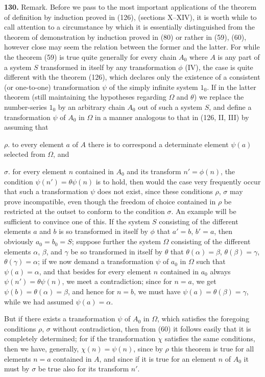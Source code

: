 \documentclass[oneside]{book}
\newcommand\mypara{\medskip\textbf}
\begin{document}
\mypara{130.} Remark. Before we pass to the most important
applications of the theorem of definition by induction
proved in (126), (sections X--XIV), it is worth
while to call attention to a circumstance by which it
is essentially distinguished from the theorem of demonstration
by induction proved in (80) or rather in
(59), (60), however close may seem the relation between
the former and the latter. For while the theorem
(59) is true quite generally for every chain $A_0$ where
$A$ is any part of a system $S$ transformed in itself by
any transformation $\phi$ (IV), the case is quite different
with the theorem (126), which declares only the existence
of a consistent (or one-to-one) transformation $\psi$
of the simply infinite system $1_0$. If in the latter theorem
(still maintaining the hypotheses regarding $\Omega$
and $\theta$) we replace the number-series $1_0$ by an arbitrary
chain $A_0$ out of such a system $S$, and define a transformation
$\psi$ of $A_0$ in $\Omega$ in a manner analogous to that
in (126, II, III) by assuming that

$\rho$. to every element $a$ of $A$ there is to correspond a
determinate element $\psi(a)$ selected from $\Omega$, and

$\sigma$. for every element $n$ contained in $A_0$ and its
transform $n'=\phi(n)$, the condition $\psi(n')=\theta \psi(n)$ is to
hold, then would the case very frequently occur that
such a transformation $\psi$ does not exist, since these conditions
$\rho$, $\sigma$ may prove incompatible, even though the
freedom of choice contained in $\rho$ be restricted at the
outset to conform to the condition $\sigma$. An example will
be sufficient to convince one of this. If the system $S$
consisting of the different elements $a$ and $b$ is so transformed
in itself by $\phi$ that $a'=b$, $b'=a$, then obviously
$a_0=b_0=S$; suppose further the system $\Omega$ consisting of
the different elements $\alpha$, $\beta$, and $\gamma$ be so transformed in
itself by $\theta$ that $\theta(\alpha)=\beta$, $\theta(\beta)=\gamma$, $\theta(\gamma)=\alpha$; if we
now demand a transformation $\psi$ of $a_0$ in $\Omega$ such that
$\psi(a)=\alpha$, and that besides for every element $n$ contained
in $a_0$ always $\psi(n')=\theta\psi(n)$, we meet a contradiction;
since for $n=a$, we get $\psi(b)=\theta(\alpha)=\beta$, and
hence for $n=b$, we must have $\psi(a)=\theta(\beta)=\gamma$, while
we had assumed $\psi(a)=\alpha$.

But if there exists a transformation $\psi$ of $A_0$ in $\Omega$,
which satisfies the foregoing conditions $\rho$, $\sigma$ without
contradiction, then from (60) it follows easily that it
is completely determined; for if the transformation $\chi$
satisfies the same conditions, then we have, generally,
$\chi(n) = \psi(n)$, since by $\rho$ this theorem is true for all elements
$n=a$ contained in $A$, and since if it is true
for an element $n$ of $A_0$ it must by $\sigma$ be true also for its
transform $n'$.
\end{document}
